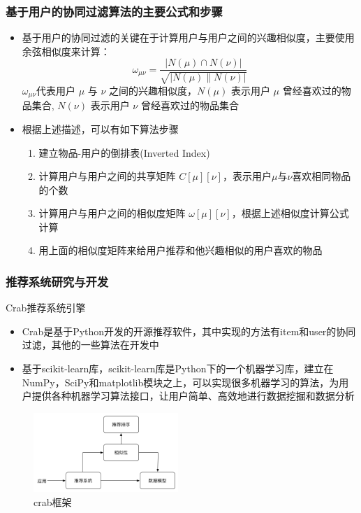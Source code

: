 \documentclass{beamer}
\begin{document}
\begin{frame}
\frametitle{基于用户的协同过滤算法的主要公式和步骤}
  \begin{itemize}
    \item \cite{crab3} 基于用户的协同过滤的关键在于计算用户与用户之间的兴趣相似度，主要使用余弦相似度来计算：\\
    \begin{displaymath}
    \omega_{\mu\nu} = \frac{|N(\mu) \cap N(\nu)|}{\sqrt{|N(\mu) \parallel N(\nu)|}}
    \end{displaymath}
    $\omega_{\mu\nu}$代表用户 $\mu$ 与 $ \nu $ 之间的兴趣相似度，$ {N(\mu)} $ 表示用户 $ \mu $ 曾经喜欢过的物品集合, $ {N(\nu)} $ 表示用户 $ \nu $ 曾经喜欢过的物品集合
    \item 根据上述描述，可以有如下算法步骤
      \begin{enumerate}
        \item 建立物品-用户的倒排表(Inverted Index)
        \item 计算用户与用户之间的共享矩阵 $C[\mu][\nu]$，表示用户$\mu$与$\nu$喜欢相同物品的个数
        \item 计算用户与用户之间的相似度矩阵 $\omega[\mu][\nu]$，根据上述相似度计算公式计算
        \item 用上面的相似度矩阵来给用户推荐和他兴趣相似的用户喜欢的物品
      \end{enumerate}
  \end{itemize}
\end{frame}

\begin{frame}
\frametitle{推荐系统研究与开发}
  \begin{block}{Crab推荐系统引擎}
    \begin{itemize}
      \item Crab是基于Python开发的开源推荐软件，其中实现的方法有item和user的协同过滤，其他的一些算法在开发中
      \item 基于scikit-learn库，scikit-learn库是Python下的一个机器学习库，建立在NumPy，SciPy和matplotlib模块之上，可以实现很多机器学习的算法，为用户提供各种机器学习算法接口，让用户简单、高效地进行数据挖掘和数据分析
    \end{itemize}
  \end{block}
  \begin{figure}
    \centering
      \includegraphics[height=3cm]{./img/crab.png}
    \caption{crab框架}
    \label{fig:visual}
  \end{figure}
\end{frame}
\end{document}
